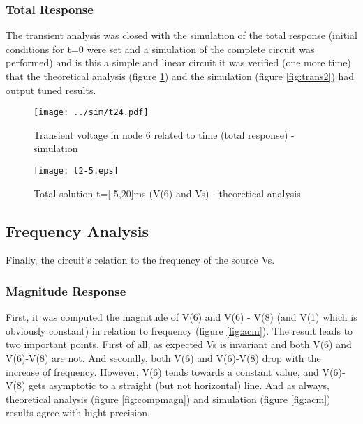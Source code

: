 \newpage
\subsubsection{Total Response}

The transient analysis was closed with the simulation of the total response (initial conditions for t=0 were set and a simulation of the complete circuit was performed) and is this a simple and linear circuit it was verified (one more time) that the theoretical analysis (figure \ref{fig:comptot}) and the simulation (figure \ref{fig:trans2}) had output tuned results.


\begin{figure}[h] \centering
  \begin{minipage}{.5\textwidth}
    \texttt{[image: ../sim/t24.pdf]}
    \caption{Transient voltage in node 6 related to time (total response) - simulation}
    \label{fig:trans2}
    \end{minipage}%
  \begin{minipage}{.5\textwidth}
  \centering
    \texttt{[image: t2-5.eps]}
    \caption{Total solution t=[-5,20]ms (V(6) and Vs) - theoretical analysis}
    \label{fig:comptot}
      \end{minipage}%
\end{figure}


\newpage

\subsection{Frequency Analysis}

Finally, the circuit's relation to the frequency of the source Vs.

\subsubsection{Magnitude Response}

First, it was computed the magnitude of V(6) and V(6) - V(8) (and V(1) which is obviously constant) in relation to frequency (figure \ref{fig:acm}). The result leads to two important points. First of all, as expected Vs is invariant and both V(6) and V(6)-V(8) are not. And secondly, both V(6) and V(6)-V(8) drop with the increase of frequency. However, V(6) tends towards a constant value, and V(6)-V(8) gets asymptotic to a straight (but not horizontal) line. And as always, theoretical analysis (figure \ref{fig:compmagn}) and simulation (figure \ref{fig:acm}) results agree with hight precision.



